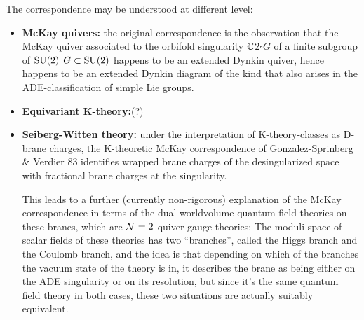 \documentclass[a4paper,8pt]{article}
\begin{document}
    The correspondence may be understood at different level:
    \begin{itemize}
        \item \textbf{McKay quivers:} the original correspondence is the observation that the McKay quiver associated to the orbifold singularity $\mathbb{C}$$2\square G$ of a finite subgroup of $\text{SU}(2)$ $G\subset\text{SU}(2)$ happens to be an extended Dynkin quiver, hence happens to be an extended Dynkin diagram of the kind that also arises in the ADE-classification of simple Lie groups.
        \item \textbf{Equivariant K-theory:}(?)
        \item  \textbf{Seiberg-Witten theory:} under the interpretation of K-theory-classes as D-brane charges, the K-theoretic McKay correspondence of Gonzalez-Sprinberg \& Verdier 83 identifies wrapped brane charges of the desingularized space with fractional brane charges at the singularity.

        This leads to a further (currently non-rigorous) explanation of the McKay correspondence in terms of the dual worldvolume quantum field theories on these branes, which are $\mathcal{N}=2$ quiver gauge theories: The moduli space of scalar fields of these theories has two ``branches'', called the Higgs branch and the Coulomb branch, and the idea is that depending on which of the branches the vacuum state of the theory is in, it describes the brane as being either on the ADE singularity or on its resolution, but since it's the same quantum field theory in both cases, these two situations are actually suitably equivalent.
    \end{itemize}

    

     

   

\pagebreak

\printbibliography
\end{document}
